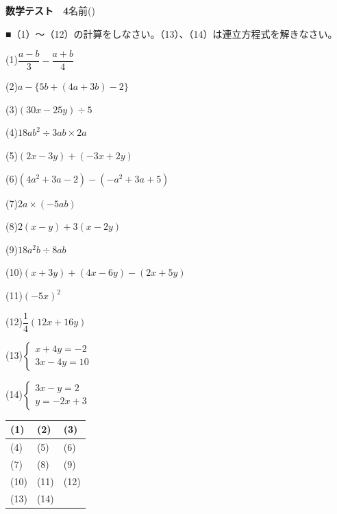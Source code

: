 \documentclass[a4paper,11pt]{ltjsarticle}
\newlength{\qcol}\setlength{\qcol}{0.47\textwidth}
\newlength{\qgap}
\newlength{\anscolw}\setlength{\anscolw}{0.30\textwidth}
\newlength{\ansh}
\newcommand{\Q}[2]{\parbox[t]{\qcol}{\raggedright (#1)\hspace{0.6em}$\displaystyle #2$}}
\newcommand{\QR}[4]{\Q{#1}{#2}\hfill\Q{#3}{#4}\par\vspace{\qgap}}
\newcommand{\anscell}[1]{\rule[-\ansdrop]{0pt}{\ansh}(#1)}
\newlength{\ansdrop}
\begin{document}
{\large\bfseries 数学テスト　4}\hfill 名前(\underline{\hspace{32mm}})\par\vspace{3mm}
■（1）〜（12）の計算をしなさい。（13）、（14）は連立方程式を解きなさい。\par\vspace{3mm}
\setlength{\qgap}{11mm}
\QR{1}{\dfrac{a-b}{3}-\dfrac{a+b}{4}}{2}{a-\{5b+(4a+3b)-2\}}
\QR{3}{(30x-25y)\div5}{4}{18ab^2\div3ab\times2a}
\QR{5}{(2x-3y)+(-3x+2y)}{6}{(4a^2+3a-2)-(-a^2+3a+5)}
\QR{7}{2a\times(-5ab)}{8}{2(x-y)+3(x-2y)}
\QR{9}{18a^2b\div8ab}{10}{(x+3y)+(4x-6y)-(2x+5y)}
\QR{11}{(-5x)^2}{12}{\dfrac{1}{4}(12x+16y)}
\QR{13}{\left\{\begin{array}{l} x+4y=-2 \\ 3x-4y=10 \end{array}\right.}{14}{\left\{\begin{array}{l} 3x-y=2 \\ y=-2x+3 \end{array}\right.}
\vspace{2mm}
\setlength{\ansh}{11mm}\setlength{\ansdrop}{7mm}%
\begin{center}\begin{tabular}{|p{\anscolw}|p{\anscolw}|p{\anscolw}|}\hline
\anscell{1} & \anscell{2} & \anscell{3} \\\hline
\anscell{4} & \anscell{5} & \anscell{6} \\\hline
\anscell{7} & \anscell{8} & \anscell{9} \\\hline
\anscell{10} & \anscell{11} & \anscell{12} \\\hline
\anscell{13} & \anscell{14} &  \\\hline
\end{tabular}\end{center}

\newpage
\end{document}
